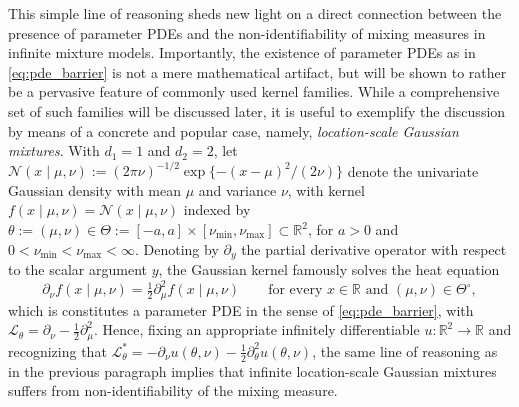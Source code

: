 \documentclass[11pt,twoside]{article} %
\begin{document}
This simple line of reasoning sheds new light on a direct connection between the presence of parameter PDEs and the non-identifiability of mixing measures in infinite mixture models. Importantly, the existence of parameter PDEs as in \eqref{eq:pde_barrier} is not a mere mathematical artifact, but will be shown to rather be a pervasive feature of commonly used kernel families. While a comprehensive set of such families will be discussed later, it is useful to exemplify the discussion by means of a concrete and popular case, namely, \emph{location-scale Gaussian mixtures}. With $d_1=1$ and $d_2=2$, let $\mathcal N(x\mid\mu,\nu):=(2\pi\nu)^{-1/2}\exp\{-(x-\mu)^2/(2\nu)\}$ denote the univariate Gaussian density with mean $\mu$ and variance $\nu$, with kernel $f(x\mid\mu,\nu)=\mathcal N(x\mid\mu,\nu)$ indexed by $\theta:=(\mu,\nu)\in\Theta:=[-a,a]\times[\nu_{\min},\nu_{\max}] \subset \mathbb{R}^2$, for $a>0$ and $0<\nu_{\min}<\nu_{\max}<\infty$. Denoting by $\partial_y$ the partial derivative operator with respect to the scalar argument $y$, the Gaussian kernel famously solves the heat equation
\begin{equation}
\label{eq:heat}
    \partial_\nu f(x\mid\mu,\nu)=\tfrac{1}{2}\partial^2_\mu f(x\mid\mu,\nu)\qquad \text{for every }x\in\mathbb R \text{ and } (\mu,\nu)\in\Theta^\circ,
\end{equation}
which is constitutes a parameter PDE in the sense of \eqref{eq:pde_barrier}, with $\mathcal L_\theta=\partial_\nu-\frac12\partial^2_\mu$. Hence, fixing an appropriate infinitely differentiable $u:\mathbb R^2\to\mathbb R$ and recognizing that $\mathcal L_\theta^*=-\partial_\nu u(\theta,\nu)-\tfrac12\partial_\theta^2u(\theta,\nu)$, the same line of reasoning as in the previous paragraph implies that infinite location-scale Gaussian mixtures suffers from non-identifiability of the mixing measure.
\end{document}
